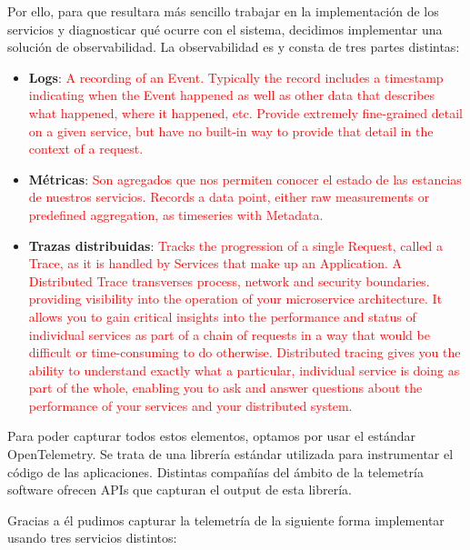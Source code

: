 Por ello, para que resultara más sencillo trabajar en la implementación de los servicios y diagnosticar qué ocurre con el sistema, decidimos implementar una solución de observabilidad. La observabilidad es \cite{parkerProblemDistributedTracing2020} y consta de tres partes distintas: %
\begin{itemize}
  \item \textbf{Logs}: \textcolor{red}{A recording of an Event. Typically the record includes a timestamp indicating when the Event happened as well as other data that describes what happened, where it happened, etc. \cite{opentelemetryOpenTelemetryDocumentation2022} Provide extremely fine-grained detail on a given service, but have no built-in way to provide that detail in the context of a request. \cite{parkerProblemDistributedTracing2020}}
  \item \textbf{Métricas}: \textcolor{red}{Son agregados que nos permiten conocer el estado de las estancias de nuestros servicios. Records a data point, either raw measurements or predefined aggregation, as timeseries with Metadata. \cite{opentelemetryOpenTelemetryDocumentation2022}}
  \item \textbf{Trazas distribuidas}: \textcolor{red}{Tracks the progression of a single Request, called a Trace, as it is handled by Services that make up an Application. A Distributed Trace transverses process, network and security boundaries. \cite{opentelemetryOpenTelemetryDocumentation2022}  providing visibility into the operation of your microservice architecture. It allows you to gain critical insights into the performance and status of individual services as part of a chain of requests in a way that would be difficult or time-consuming to do otherwise. Distributed tracing gives you the ability to understand exactly what a particular, individual service is doing as part of the whole, enabling you to ask and answer questions about the performance of your services and your distributed system. \cite{parkerProblemDistributedTracing2020}}
\end{itemize}

Para poder capturar todos estos elementos, optamos por usar el estándar OpenTelemetry. Se trata de una librería estándar utilizada para instrumentar el código de las aplicaciones. Distintas compañías del ámbito de la telemetría software ofrecen APIs que capturan el output de esta librería.

Gracias a él pudimos capturar la telemetría de la siguiente forma implementar usando tres servicios distintos:

